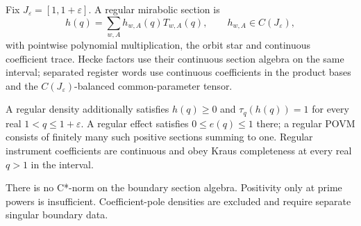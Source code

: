 \begin{definition}
Fix $J_\varepsilon=[1,1+\varepsilon]$.  A regular mirabolic section is
\[
 h(q)=\sum_{w,A}h_{w,A}(q)T_{w,A}(q),
 \qquad h_{w,A}\in C(J_\varepsilon),
\]
with pointwise polynomial multiplication, the orbit star and continuous
coefficient trace.  Hecke factors use their continuous section algebra on
the same interval; separated register words use continuous coefficients in
the product bases and the $C(J_\varepsilon)$-balanced common-parameter
tensor.

A regular density additionally satisfies $h(q)\geq0$ and
$\tau_q(h(q))=1$ for every real $1<q\leq1+\varepsilon$.  A regular effect
satisfies $0\leq e(q)\leq1$ there; a regular POVM consists of finitely many
such positive sections summing to one.  Regular instrument coefficients are
continuous and obey Kraus completeness at every real $q>1$ in the interval.
\end{definition}
\begin{scope}
There is no C*-norm on the boundary section algebra.  Positivity only at
prime powers is insufficient.  Coefficient-pole densities are excluded and
require separate singular boundary data.
\end{scope}

